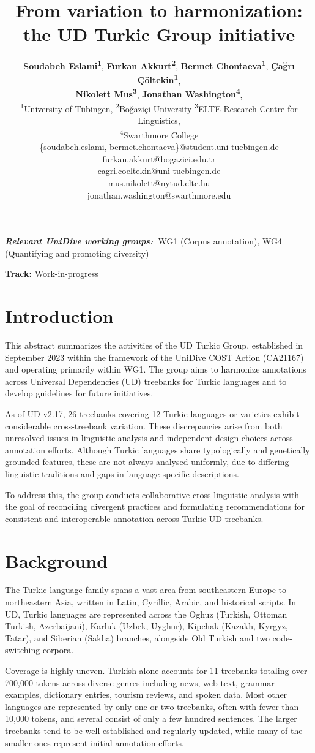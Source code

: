 \documentclass[11pt,a4paper]{article}
\title{From variation to harmonization: the UD Turkic Group initiative}
\author{
\textbf{Soudabeh Eslami\textsuperscript{1}},
\textbf{Furkan Akkurt\textsuperscript{2}},
\textbf{Bermet Chontaeva\textsuperscript{1}},
\textbf{{\c{C}}a{\u{g}}r{\i} {\c{C}}{\"o}ltekin\textsuperscript{1}},\\
\textbf{Nikolett Mus\textsuperscript{3}},
\textbf{Jonathan Washington\textsuperscript{4}},
\\
\textsuperscript{1}University of Tübingen,
 \textsuperscript{2}Bo\u{g}aziçi University
 \textsuperscript{3}ELTE Research Centre for Linguistics,\\
  \textsuperscript{4}Swarthmore College
\\
\{soudabeh.eslami, bermet.chontaeva\}@student.uni-tuebingen.de\\
furkan.akkurt@bogazici.edu.tr\\
cagri.coeltekin@uni-tuebingen.de\\
mus.nikolett@nytud.elte.hu\\
jonathan.washington@swarthmore.edu\\
}
\providecommand{\wgs}[1]{%
  \noindent\begin{small}\textbf{\textit{Relevant UniDive working groups:~}}#1\end{small}%
}
\begin{document}
\maketitle


\wgs{WG1 (Corpus annotation), WG4 (Quantifying and promoting diversity)}

\noindent\textbf{Track:} Work-in-progress

\section{Introduction}

This abstract summarizes the activities of the UD Turkic Group, established in September 2023 within the framework of the UniDive COST Action (CA21167) and operating primarily within WG1. The group aims to harmonize annotations across Universal Dependencies (UD) treebanks for Turkic languages and to develop guidelines for future initiatives.

As of UD v2.17, 26 treebanks covering 12 Turkic languages or varieties exhibit considerable cross-treebank variation. These discrepancies arise from both unresolved issues in linguistic analysis and independent design choices across annotation efforts. Although Turkic languages share typologically and genetically grounded features, these are not always analysed uniformly, due to differing linguistic traditions and gaps in language-specific descriptions.

To address this, the group conducts collaborative cross-linguistic analysis with the goal of reconciling divergent practices and formulating recommendations for consistent and interoperable annotation across Turkic UD treebanks.

\section{Background}

The Turkic language family spans a vast area from southeastern Europe to northeastern Asia, written in Latin, Cyrillic, Arabic, and historical scripts. In UD, Turkic languages are represented across the Oghuz (Turkish, Ottoman Turkish, Azerbaijani), Karluk (Uzbek, Uyghur), Kipchak (Kazakh, Kyrgyz, Tatar), and Siberian (Sakha) branches, alongside Old Turkish and two code-switching corpora.

Coverage is highly uneven. Turkish alone accounts for 11 treebanks totaling over 700,000 tokens across diverse genres including news, web text, grammar examples, dictionary entries, tourism reviews, and spoken data. Most other languages are represented by only one or two treebanks, often with fewer than 10,000 tokens, and several consist of only a few hundred sentences. The larger treebanks tend to be well-established and regularly updated, while many of the smaller ones represent initial annotation efforts.
\end{document}
